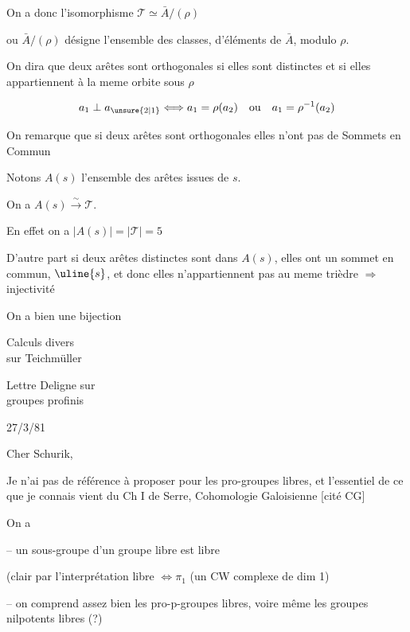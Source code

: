 On a donc l'isomorphisme $\mathcal T\simeq\bar A/(\rho)$

ou $\bar A/(\rho)$ désigne l'ensemble des classes, d'éléments de $\bar A$, modulo $\rho$.

On dira que deux arêtes sont orthogonales si elles sont distinctes et si elles appartiennent à la meme orbite sous $\rho$

\uline{}
\[
a_1\perp a_{\unsure{2|1}}
\Longleftrightarrow
a_1=\rho(a_2)\quad\text{ou}\quad a_1=\rho^{-1}(a_2)
\]

On remarque que si deux arêtes sont orthogonales elles n'ont pas de Sommets en Commun

Notons $A(s)$ l'ensemble des arêtes issues de $s$.

On a $A(s)\xrightarrow{\sim}\mathcal T$.

En effet on a $|A(s)|=|\mathcal T|=5$

D'autre part si deux arêtes  distinctes sont dans $A(s)$, elles ont un sommet en commun, $\uline{s}$, et donc elles n'appartiennent pas au meme trièdre $\Rightarrow$ injectivité

On a bien une bijection


\begin{flushright}
Calculs divers\\
sur Teichmüller

\medskip
Lettre Deligne sur\\
groupes profinis
\end{flushright}


\begin{flushright}
27/3/81
\end{flushright}

Cher Schurik,

Je n'ai pas de référence à proposer pour les pro-groupes libres, et l'essentiel de ce que je connais vient du Ch I de Serre, Cohomologie Galoisienne [cité CG]

On a

-- un sous-groupe d'un groupe libre est libre

\quad (clair par l'interprétation libre $\Longleftrightarrow\pi_1$ (un CW complexe de dim 1)

-- on comprend assez bien les pro-p-groupes libres, voire même les groupes nilpotents libres (?)


